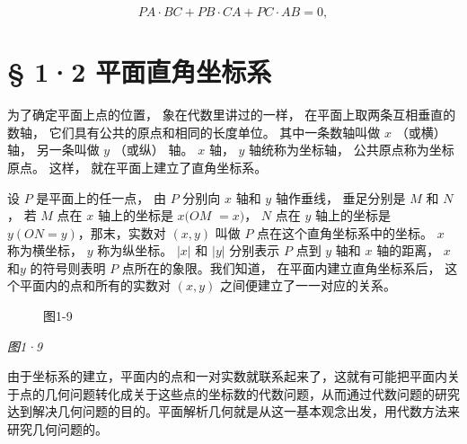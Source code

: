 \[
PA \cdot BC + PB \cdot CA + PC \cdot AB = 0,
\]

\section{§ 1·2
平面直角坐标系}\label{ux5e73ux9762ux76f4ux89d2ux5750ux6807ux7cfb}

为了确定平面上点的位置， 象在代数里讲过的一样，
在平面上取两条互相垂直的数轴， 它们具有公共的原点和相同的长度单位。
其中一条数轴叫做 \(x\) （或横） 轴， 另一条叫做 \(y\) （或纵） 轴。
\(x\) 轴， \(y\) 轴统称为坐标轴， 公共原点称为坐标原点。 这样，
就在平面上建立了直角坐标系。

设 \(P\) 是平面上的任一点， 由 \(P\) 分别向 \(x\) 轴和 \(y\) 轴作垂线，
垂足分别是 \(M\) 和 \(N\)， 若 \(M\) 点在 \(x\) 轴上的坐标是 \(x(OM\)
\(= x)\)， \(N\) 点在 \(y\) 轴上的坐标是 \(y(ON = y)\)，那末，实数对
\((x,y)\) 叫做 \(P\) 点在这个直角坐标系中的坐标。 \(x\) 称为横坐标，
\(y\) 称为纵坐标。 \(|x|\) 和 \(|y|\) 分别表示 \(P\) 点到 \(y\) 轴和
\(x\) 轴的距离， \(x\) 和\(y\) 的符号则表明 \(P\)
点所在的象限。我们知道， 在平面内建立直角坐标系后，
这个平面内的点和所有的实数对 \((x, y)\) 之间便建立了一一对应的关系。

\begin{figure}
\centering
{}
\caption{图1-9}
\end{figure}

\emph{图1·9}

由于坐标系的建立，平面内的点和一对实数就联系起来了，这就有可能把平面内关于点的几何问题转化成关于这些点的坐标数的代数问题，从而通过代数问题的研究达到解决几何问题的目的。平面解析几何就是从这一基本观念出发，用代数方法来研究几何问题的。


